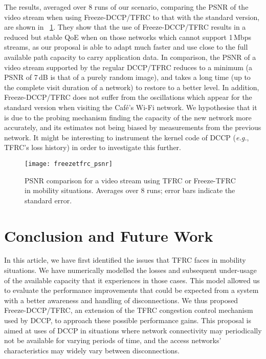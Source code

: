 \documentclass[twocolumn]{nictatechreport}
\newcommand{\latinlocution}[1]{\textit{#1}}
\newcommand{\eg}{\latinlocution{e.g.}}
\begin{document}
The results, averaged over 8 runs of our scenario, comparing the PSNR of the
video stream when using Freeze-DCCP/TFRC to that with the standard version, are
shown in \figurename~\ref{fig:freezetfrc_psnr}. They show that the use of
Freeze-DCCP/TFRC results in a reduced but stable QoE when on those networks
which cannot support 1\,Mbps streams, as our proposal is able to adapt much
faster and use close to the full available path capacity to carry application
data. In comparison, the PSNR of a video stream supported by the regular
DCCP/TFRC reduces to a minimum (a PSNR of 7\,dB is that of a purely random
image), and takes a long time (up to the complete visit duration of a network)
to restore to a better level. In addition, Freeze-DCCP/TFRC does not suffer from
the oscillations which appear for the standard version when visiting the Café's
Wi-Fi network. We hypothesise that it is due to the probing mechanism finding
the capacity of the new network more accurately, and its estimates not being
biased by measurements from the previous network. It might be interesting to
instrument the kernel code of DCCP (\eg, TFRC's loss history) in order to
investigate this further.

\begin{figure}[tb]
  \centering
  \texttt{[image: freezetfrc\_psnr]}
  \caption[PSNR comparison for a video stream using TFRC or Freeze-TFRC in
  mobility situations]{PSNR comparison for a video stream using TFRC or
  Freeze-TFRC in mobility situations. Averages over 8 runs; error bars
  indicate the standard error.}
  \label{fig:freezetfrc_psnr}
\end{figure}



\section{Conclusion and Future Work}
\label{freezetfrc:conclusion}

In this article, we have first identified the issues that TFRC faces in
mobility situations.  We have numerically modelled the losses and subsequent
under-usage of the available capacity that it experiences in those cases. This
model allowed us to evaluate the performance improvements that could be expected
from a system with a better awareness and handling of disconnections.  We thus
proposed Freeze-DCCP/TFRC, an extension of the TFRC congestion control
mechanism used by DCCP, to approach these possible performance gains. This
proposal is aimed at uses of DCCP in situations where network connectivity may
periodically not be available for varying periods of time, and the access
networks' characteristics may widely vary between disconnections.
\end{document}
